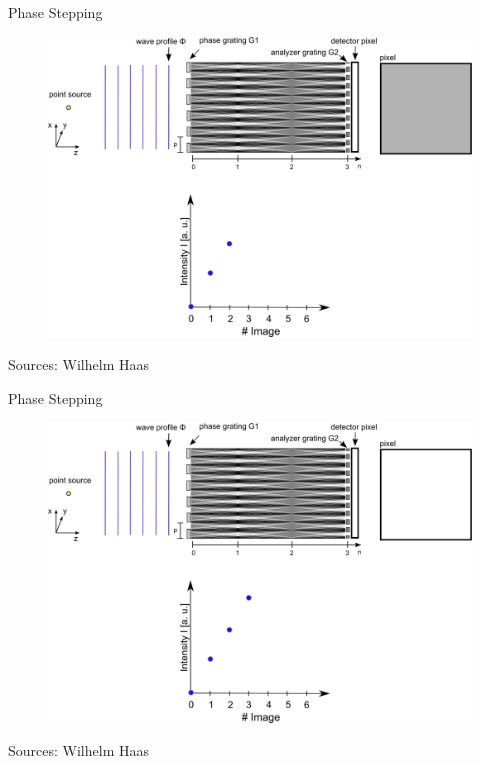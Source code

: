 \begin{frame}{Phase Stepping}
    \vspace{-0.5cm}
    \begin{figure}
        \includegraphics[height=0.92\textheight]{images/phase3.eps}
    \end{figure}
    \begin{flushright}
        \scriptsize Sources: Wilhelm Haas
    \end{flushright}
\end{frame}

\begin{frame}{Phase Stepping}
    \vspace{-0.5cm}
    \begin{figure}
        \includegraphics[height=0.92\textheight]{images/phase4.eps}
    \end{figure}
    \begin{flushright}
        \scriptsize Sources: Wilhelm Haas
    \end{flushright}
\end{frame}

